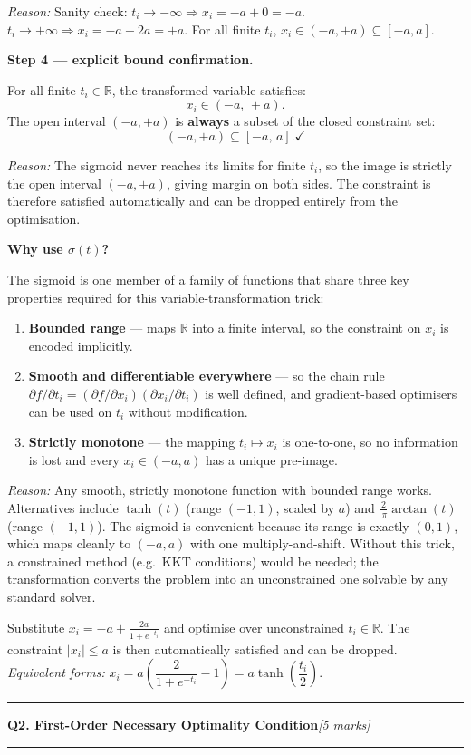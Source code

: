 \documentclass[10pt,a4paper]{article}
\newcommand{\sectitle}[2]{%
  \vspace{10pt}\noindent\rule{\linewidth}{0.8pt}\par\vspace{2pt}%
  {\large\textbf{#1}\hfill\normalsize\textit{[#2 marks]}}\par
  \vspace{2pt}\rule{\linewidth}{0.4pt}\vspace{4pt}}
\newcommand{\reason}[1]{%
  \begin{mdframed}[backgroundcolor=reasonbg, linewidth=0.4pt,
    innertopmargin=3pt, innerbottommargin=3pt,
    innerleftmargin=6pt, innerrightmargin=6pt]
    \small\textit{Reason:} \small #1
  \end{mdframed}\vspace{2pt}}
\newenvironment{resultbox}{%
  \begin{mdframed}[backgroundcolor=boxbg, linewidth=0.6pt,
    innertopmargin=5pt, innerbottommargin=5pt,
    innerleftmargin=8pt, innerrightmargin=8pt]
}{\end{mdframed}}
\begin{document}
\reason{Sanity check: $t_i\to-\infty \Rightarrow x_i = -a+0 = -a$.
        $t_i\to+\infty \Rightarrow x_i = -a+2a = +a$.
        For all finite $t_i$, $x_i\in(-a,+a)\subseteq[-a,a]$. \checkmark}

\textbf{Step 4 --- explicit bound confirmation.}

For all finite $t_i\in\mathbb{R}$, the transformed variable satisfies:
\[
  x_i \in (-a,\,+a).
\]
The open interval $(-a,+a)$ is \textbf{always} a subset of the closed constraint set:
\[
  (-a,+a) \subseteq [-a,\,a]. \checkmark
\]
\reason{The sigmoid never reaches its limits for finite $t_i$, so the image is strictly
        the open interval $(-a,+a)$, giving margin on both sides. The constraint is
        therefore satisfied automatically and can be dropped entirely from the optimisation.}
\newpage
\textbf{Why use $\sigma(t)$?}

The sigmoid is one member of a family of functions that share three key properties
required for this variable-transformation trick:
\begin{enumerate}
  \item \textbf{Bounded range} --- maps $\mathbb{R}$ into a finite interval,
        so the constraint on $x_i$ is encoded implicitly.
  \item \textbf{Smooth and differentiable everywhere} --- so the chain rule
        $\partial f/\partial t_i = (\partial f/\partial x_i)(\partial x_i/\partial t_i)$
        is well defined, and gradient-based optimisers can be used on $t_i$
        without modification.
  \item \textbf{Strictly monotone} --- the mapping $t_i\mapsto x_i$ is one-to-one,
        so no information is lost and every $x_i\in(-a,a)$ has a unique pre-image.
\end{enumerate}

\reason{Any smooth, strictly monotone function with bounded range works.
        Alternatives include $\tanh(t)$ (range $(-1,1)$, scaled by $a$) and
        $\tfrac{2}{\ \pi}\arctan(t)$ (range $(-1,1)$).
        The sigmoid is convenient because its range is exactly $(0,1)$,
        which maps cleanly to $(-a,a)$ with one multiply-and-shift.
        Without this trick, a constrained method (e.g.\ KKT conditions)
        would be needed; the transformation converts the problem into
        an unconstrained one solvable by any standard solver.}

\begin{resultbox}
Substitute $\displaystyle x_i = -a + \frac{2a}{1+e^{-t_i}}$
and optimise over unconstrained $t_i\in\mathbb{R}$.
The constraint $|x_i|\le a$ is then automatically satisfied and can be dropped.
\smallskip\\
\textit{Equivalent forms:}\;
$x_i = a\!\left(\dfrac{2}{1+e^{-t_i}}-1\right) = a\tanh\!\left(\dfrac{t_i}{2}\right)$.
\end{resultbox}
\newpage
\sectitle{Q2. First-Order Necessary Optimality Condition}{5}
\end{document}
